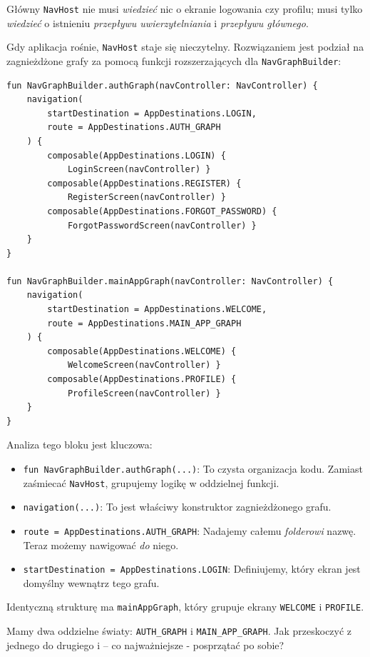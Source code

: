 Główny \texttt{NavHost} nie musi \textit{wiedzieć} nic o ekranie logowania czy profilu; musi tylko \textit{wiedzieć} o istnieniu \textit{przepływu uwierzytelniania} i \textit{przepływu głównego}.

Gdy aplikacja rośnie, \texttt{NavHost} staje się nieczytelny. Rozwiązaniem jest podział na zagnieżdżone grafy za pomocą funkcji rozszerzających dla \texttt{NavGraphBuilder}:

\begin{verbatim}
fun NavGraphBuilder.authGraph(navController: NavController) {
    navigation(
        startDestination = AppDestinations.LOGIN,
        route = AppDestinations.AUTH_GRAPH
    ) {
        composable(AppDestinations.LOGIN) {
            LoginScreen(navController) }
        composable(AppDestinations.REGISTER) {
            RegisterScreen(navController) }
        composable(AppDestinations.FORGOT_PASSWORD) {
            ForgotPasswordScreen(navController) }
    }
}

fun NavGraphBuilder.mainAppGraph(navController: NavController) {
    navigation(
        startDestination = AppDestinations.WELCOME,
        route = AppDestinations.MAIN_APP_GRAPH
    ) {
        composable(AppDestinations.WELCOME) {
            WelcomeScreen(navController) }
        composable(AppDestinations.PROFILE) {
            ProfileScreen(navController) }
    }
}
\end{verbatim}

Analiza tego bloku jest kluczowa:
\begin{itemize}
\item \texttt{fun NavGraphBuilder.authGraph(...)}: To czysta organizacja kodu. Zamiast zaśmiecać \texttt{NavHost}, grupujemy logikę w oddzielnej funkcji.
\item \texttt{navigation(...)}: To jest właściwy konstruktor zagnieżdżonego grafu.
\item \texttt{route = AppDestinations.AUTH\_GRAPH}: Nadajemy całemu \textit{folderowi} nazwę. Teraz możemy nawigować \textit{do} niego.
\item \texttt{startDestination = AppDestinations.LOGIN}: Definiujemy, który ekran jest domyślny wewnątrz tego grafu.
\end{itemize}

Identyczną strukturę ma \texttt{mainAppGraph}, który grupuje ekrany \texttt{WELCOME} i \texttt{PROFILE}.

Mamy dwa oddzielne światy: \texttt{AUTH\_GRAPH} i \texttt{MAIN\_APP\_GRAPH}. Jak przeskoczyć z jednego do drugiego i – co najważniejsze - posprzątać po sobie?

